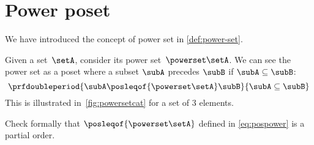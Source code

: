 \section{Power poset}

We have introduced the concept of power set in \cref{def:power-set}.

\begin{definition}
    \label{ex:hasseinclusion}
    Given a set~$\setA$, consider its power set~$\powerset\setA$.
    We can see the power set as a poset where a subset $\subA$ precedes $\subB$ if $\subA \subseteq \subB$:
    \begin{equation}\label{eq:pospower}
        \prfdoubleperiod{
            \subA \posleqof{\powerset\setA} \subB
        }{
            \subA \subseteq \subB
        }
    \end{equation}
    This is illustrated in~\cref{fig:powersetcat} for a set of 3 elements.
\end{definition}
\begin{exercise}
    Check formally that $\posleqof{\powerset\setA}$ defined in \cref{eq:pospower} is a partial order.
\end{exercise}
\begin{solution}
    \missingsolution
\end{solution}

\begin{figure*}[h]
    \centering
    \caption{Power set as a poset.}
    \label{fig:powersetcat}
\end{figure*}

